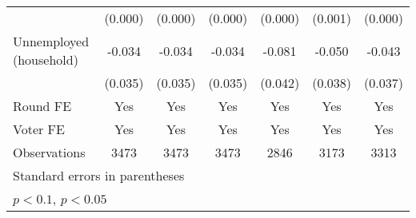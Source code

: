 \begin{table}[htbp]
\begin{tabular}{l*{6}{c}}
                    &     (0.000)       &     (0.000)       &     (0.000)       &     (0.000)       &     (0.001)       &     (0.000)       \\
[1em]
Unnemployed (household)&      -0.034       &      -0.034       &      -0.034       &      -0.081\sym{+}&      -0.050       &      -0.043       \\
                    &     (0.035)       &     (0.035)       &     (0.035)       &     (0.042)       &     (0.038)       &     (0.037)       \\
[1em]
\hline  Round FE    &         Yes       &         Yes       &         Yes       &         Yes       &         Yes       &         Yes       \\
[1em]
Voter FE            &         Yes       &         Yes       &         Yes       &         Yes       &         Yes       &         Yes       \\
\hline
Observations        &        3473       &        3473       &        3473       &        2846       &        3173       &        3313       \\
\hline\hline
\multicolumn{7}{l}{\footnotesize Standard errors in parentheses}\\
\multicolumn{7}{l}{\footnotesize \sym{+} \(p<0.1\), \sym{*} \(p<0.05\)}\\
\end{tabular}
\end{table}
